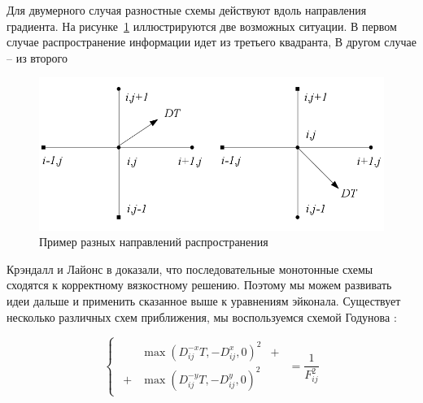 Для двумерного случая разностные схемы действуют вдоль направления
градиента. На рисунке~\ref{fig:upwind-schema} иллюстрируются две
возможных ситуации. В первом случае распространение информации идет из
третьего квадранта, В другом случае -- из второго
\begin{figure}[H]
  \centering
  \includegraphics[width=\linewidth]{img/upwind-schema.png}
  \hfil \caption{Пример разных направлений распространения}
  \label{fig:upwind-schema}

\end{figure}

Крэндалл и Лайонс в \cite{V1983} доказали, что последовательные
монотонные схемы сходятся к корректному вязкостному решению. Поэтому
мы можем развивать идеи дальше и применить сказанное выше к уравнениям
эйконала. Существует несколько различных схем приближения, мы
воспользуемся схемой Годунова \cite{F2002}:

\begin{equation}
  \label{eq:godunov-schema}
  \begin{cases}
    \begin{matrix}
       &\max (D^{-x}_{ij}T, -D^{x}_{ij},0)^2 &+\\
     + &\max (D^{-y}_{ij}T, -D^{y}_{ij},0)^2&
    \end{matrix}
    \end{cases}= \frac{1}{F_{ij}^2}
\end{equation}





